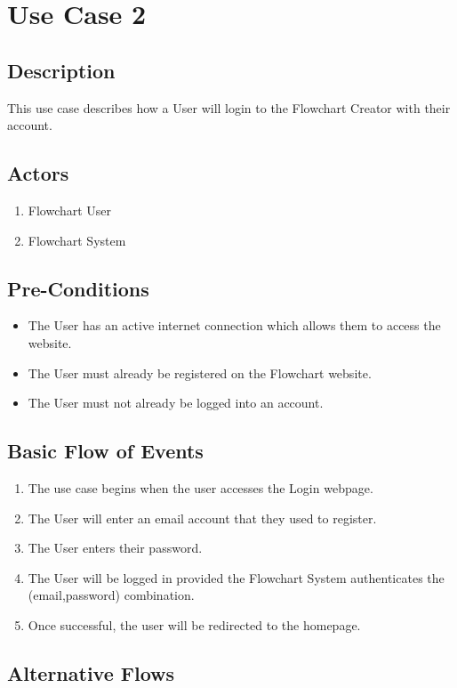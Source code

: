 \documentclass[a4paper,11pt]{article}
\begin{document}
\section{Use Case 2}
\subsection{Description}
This use case describes how a User will login to the Flowchart Creator with their account.

\subsection{Actors}
\begin{enumerate}
\item Flowchart User
\item Flowchart System
\end{enumerate}

\subsection{Pre-Conditions}
\begin{itemize}
\item The User has an active internet connection which allows them to access the website.
\item The User must already be registered on the Flowchart website.
\item The User must not already be logged into an account.
\end{itemize}

\subsection{Basic Flow of Events}
\begin{enumerate}
\item The use case begins when the user accesses the Login webpage.
\item The User will enter an email account that they used to register.
\item The User enters their password.
\item The User will be logged in provided the Flowchart System authenticates the (email,password) combination.
\item Once successful, the user will be redirected to the homepage.
\end{enumerate}

\subsection{Alternative Flows}
\end{document}
